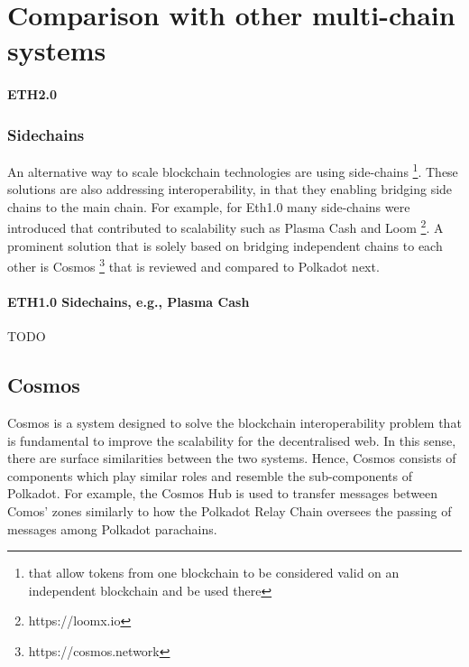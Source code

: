 \section{Comparison with other multi-chain systems}\label{sec:comparison}
\paragraph{ETH2.0}


\subsubsection*{Sidechains}
An alternative way to scale blockchain technologies are using side-chains \footnote{that allow tokens from one blockchain to be considered valid on an independent blockchain and be used there}. These solutions are also addressing interoperability, in that they enabling bridging side chains to the main chain. For example, for Eth1.0 many side-chains were introduced that contributed to scalability such as Plasma Cash and Loom \footnote{https://loomx.io}.
A prominent solution that is solely based on bridging independent chains to each other is Cosmos \footnote{https://cosmos.network} that is reviewed and compared to Polkadot next.

\paragraph{ETH1.0 Sidechains, e.g., Plasma Cash}
TODO

\subsection{Cosmos}

Cosmos is a system designed to solve the blockchain interoperability problem that is fundamental to improve the scalability for the decentralised web. In this sense, there are surface similarities between the two systems. Hence, Cosmos consists of components which play similar roles and resemble the sub-components of Polkadot. For example, the Cosmos Hub is used to transfer messages between Comos' zones similarly to how the Polkadot Relay Chain oversees the passing of messages among Polkadot parachains.

